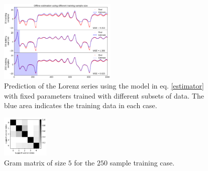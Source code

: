 \begin{figure}[t!]
	\centering
	\includegraphics[width=0.5\textwidth]{img/Lorenz_Offline3}
	\caption{Prediction of the Lorenz series using the model in eq. \eqref{estimator} with fixed parameters trained with different subsets of data. The blue area indicates the training data in each case.}
	\label{fig:lorenz-series}
\end{figure}

\begin{figure}[t!]
	\centering
	\includegraphics[width=0.2\textwidth]{img/Gram_lorenz}
	\caption{Gram matrix of size $5$ for the $250$ sample training case.}
	\label{fig:lorenz-gram}
\end{figure}

